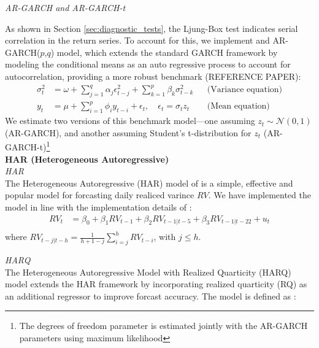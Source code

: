 \textit{AR-GARCH and AR-GARCH-t}

As shown in Section \ref{sec:diagnostic_tests}, the Ljung-Box test indicates serial correlation in the return series. To account for this, we implement and AR-GARCH($p$,$q$) model, which extends the standard GARCH framework by modeling the conditional means as an auto regressive process to account for autocorrelation, providing a more robust benchmark (REFERENCE PAPER):
\begin{equation}
    \begin{aligned}
        \sigma_t^2 &= \omega + \sum_{j=1}^{q} \alpha_j \epsilon_{t-j}^2 + \sum_{k=1}^{p} \beta_k \sigma_{t-k}^2 &&\text{(Variance equation)} \\
        y_t &= \mu + \sum_{i=1}^{p} \phi_i y_{t-i} + \epsilon_t, \quad \epsilon_t = \sigma_t z_t &&\text{(Mean equation)}
    \end{aligned}
\end{equation}
We estimate two versions of this benchmark model—one assuming $z_t \sim \mathcal{N}(0,1)$ (AR-GARCH), and another assuming Student's t-distribution for $z_t$ (AR-GARCH-t)\footnote{The degrees of freedom parameter is estimated jointly with the AR-GARCH parameters using maximum likelihood}
\\

\textbf{HAR (Heterogeneous Autoregressive)} \\
\textit{HAR} \\
The Heterogeneous Autoregressive (HAR) model of \textcite{corsi2009har} is a simple, effective and popular model for forcasting daily realiced varince $RV$. We have implemented the model in line with the implementation details of \textcite{Bollerslev2016}:
\begin{equation}
    \begin{aligned}
        RV_t &= \beta_0 + \beta_1 RV_{t-1} + \beta_2 RV_{t-1|t-5} + \beta_3 RV_{t-1|t-22} + u_t \\
    \end{aligned}
\end{equation}
where $RV_{t-j|t-h} = \frac{1}{h+1-j} \sum_{i=j}^{h} RV_{t-i}$, with $j \leq h$. 

\textit{HARQ} \\
The Heterogeneous Autoregressive Model with Realized Quarticity (HARQ) model extends the HAR framework by incorporating realized quarticity (RQ) as an additional regressor to improve forcast accuracy. The model is defined as \parencite{Bollerslev2016}:

